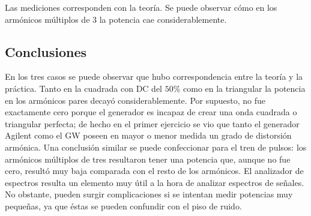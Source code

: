 Las mediciones corresponden con la teoría. Se puede observar cómo en los armónicos múltiplos de $3$ la potencia cae considerablemente.

\subsection{Conclusiones}

En los tres casos se puede observar que hubo correspondencia entre la teoría y la práctica. Tanto en la cuadrada con DC del $50\%$ como en la triangular la potencia en los armónicos pares decayó considerablemente. Por supuesto, no fue exactamente cero porque el generador es incapaz de crear una onda cuadrada o triangular perfecta; de hecho en el primer ejercicio se vio que tanto el generador Agilent como el GW poseen en mayor o menor medida un grado de distorsión armónica. Una conclusión similar se puede confeccionar para el tren de pulsos: los armónicos múltiplos de tres resultaron tener una potencia que, aunque no fue cero, resultó muy baja comparada con el resto de los armónicos. El analizador de espectros resulta un elemento muy útil a la hora de analizar espectros de señales. No obstante, pueden surgir complicaciones si se intentan medir potencias muy pequeñas, ya que éstas se pueden confundir con el piso de ruido.
